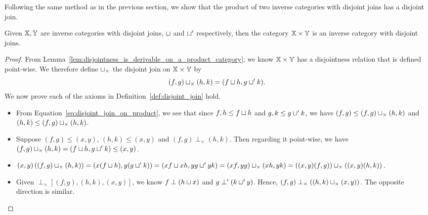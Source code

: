 Following the same method as in the previous section, we show that the product of two
inverse categories with disjoint joins has a disjoint join.
\begin{lemma}\label{lem:disjoint_join_is_in_product_category}
  Given $\mathbb{X}, \mathbb{Y}$ are inverse categories with disjoint joins, $\sqcup$ and $\sqcup'$ respectively,
  then the category $\mathbb{X} \times \mathbb{Y}$ is an inverse category with disjoint joins.
\end{lemma}
\begin{proof}
  From Lemma~\ref{lem:disjointness_is_derivable_on_a_product_category}, we know $\mathbb{X}\times\mathbb{Y}$ has a
  disjointness relation that is defined point-wise.  We therefore define $\sqcup_{\times}$ the
  disjoint join on $\mathbb{X}\times\mathbb{Y}$ by
  \begin{equation}
    (f,g)\sqcup_{\times}(h,k) = (f \sqcup h, g \sqcup' k). \label{eq:disjoint_join_on_product}
  \end{equation}
  We now prove each of the axioms in Definition~\ref{def:disjoint_join} hold.
  \begin{itemize}
    \item [\axiom{DJ}{1}] From Equation~\ref{eq:disjoint_join_on_product}, we see that since
      $f,h \le f \sqcup h$ and $g,k \le g \sqcup' k$, we have $(f,g) \le (f,g)\sqcup_{\times}(h,k)$
      and  $(h,k) \le (f,g)\sqcup_{\times}(h,k)$.
    \item [\axiom{DJ}{2}] Suppose $(f,g) \le (x,y)$, $(h,k) \le (x,y)$ and $(f,g) \perp_{\times}
      (h,k)$. Then regarding it point-wise, we have $(f,g)\sqcup_{\times}(h,k) = (f \sqcup h, g
      \sqcup' k) \le (x,y)$.
    \item [\axiom{DJ}{3}] $(x,y)\left((f,g)\sqcup_{\times}(h,k)\right) = (x(f \sqcup h), y(g
      \sqcup' k)) = (x f \sqcup x h, y g \sqcup' y k) = (x f,y g)\sqcup_{\times}(x h,y k) =
      ((x,y)(f,g))\sqcup_{\times}((x,y)(h,k))$.
    \item [\axiom{DJ}{4}] Given $\perp_{\times}\!\![(f,g),(h,k),(x,y)]$, we know $f \perp (h\sqcup
      x)$ and $g \perp' (k\sqcup' y)$. Hence, $(f,g) \perp_{\times}((h,k)\sqcup_{\times}(x,y))$. The
      opposite direction is similar.
  \end{itemize}
\end{proof}

